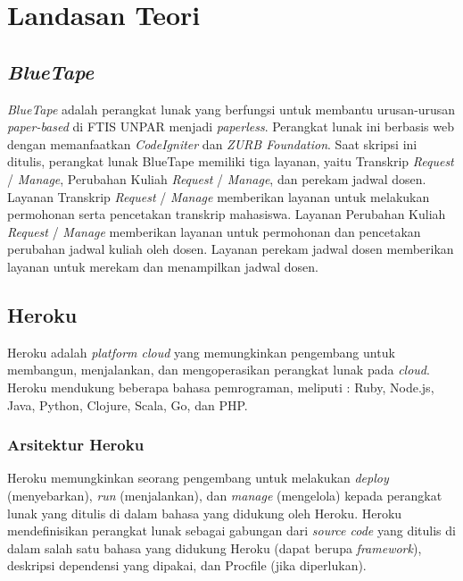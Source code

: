 
\chapter{Landasan Teori}
\label{chap:teori}
\setcounter{secnumdepth}{3}



\section{\textit{BlueTape}}
\label{sec:BlueTape}
\textit{BlueTape} adalah perangkat lunak yang berfungsi untuk membantu urusan-urusan \textit{paper-based} di FTIS UNPAR menjadi \textit{paperless}. Perangkat lunak ini berbasis web dengan memanfaatkan \textit{CodeIgniter} dan \textit{ZURB Foundation}. Saat skripsi ini ditulis, perangkat lunak BlueTape memiliki tiga layanan, yaitu Transkrip \textit{Request} / \textit{Manage}, Perubahan Kuliah \textit{Request} / \textit{Manage}, dan perekam jadwal dosen. Layanan Transkrip \textit{Request} / \textit{Manage} memberikan layanan untuk melakukan permohonan serta pencetakan transkrip mahasiswa. Layanan Perubahan Kuliah \textit{Request} / \textit{Manage} memberikan layanan untuk permohonan dan pencetakan perubahan jadwal kuliah oleh dosen. Layanan perekam jadwal dosen memberikan layanan untuk merekam dan menampilkan jadwal dosen. \footnotemark
{}


\section{Heroku ~\cite{heroku}}
\label{sec:Heroku}
Heroku adalah \textit{platform cloud} yang memungkinkan pengembang untuk membangun, menjalankan, dan mengoperasikan perangkat lunak pada \textit{cloud}. Heroku mendukung beberapa bahasa pemrograman, meliputi : Ruby, Node.js, Java, Python, Clojure, Scala, Go, dan PHP. 

\subsection{Arsitektur Heroku}
Heroku memungkinkan seorang pengembang untuk melakukan \textit{deploy} (menyebarkan), \textit{run} (menjalankan), dan \textit{manage} (mengelola) kepada perangkat lunak yang ditulis di dalam bahasa yang didukung oleh Heroku. Heroku mendefinisikan perangkat lunak sebagai gabungan dari \textit{source code} yang ditulis di dalam salah satu bahasa yang didukung Heroku (dapat berupa \textit{framework}), deskripsi dependensi yang dipakai, dan Procfile (jika diperlukan).

